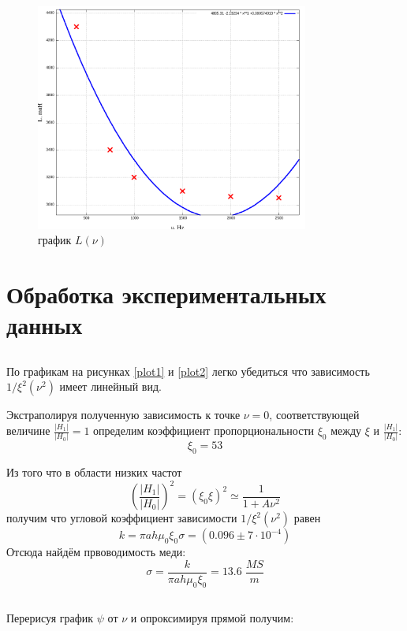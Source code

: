 \documentclass{article}
\begin{document}
\begin{figure}[H]
    \centering
    \includegraphics[width=0.8\textwidth]{6.png}
    \caption{график \( L(\nu) \)}
    \label{fig:L}
\end{figure}

\section {Обработка экспериментальных данных}
\subsection{}
\label{sigma_1}
По графикам на рисунках \ref{plot1} и \ref{plot2} легко убедиться что зависимость \( 1/\xi^2(\nu^2) \)
имеет линейный вид.

Экстраполируя полученную зависимость к точке \( \nu = 0 \), соответствующей величине \( \frac{|H_1|}{|H_0|} = 1 \)
определим коэффициент пропорциональности \( \xi_0 \) между \( \xi \) и \( \frac{|H_1|}{|H_0|} \): 
\[ \xi_0 = 53 \]

Из того что в области низких частот
\[ \left(\frac{|H_1|}{|H_0|}\right)^2 = (\xi_0\xi)^2 \simeq \frac{1}{1 + A\nu^2} \]
получим что угловой коэффициент зависимости \( 1/\xi^2(\nu^2) \) равен
\[ k = \pi ah\mu_0\xi_0\sigma = (0.096 \pm 7\cdot10^{-4}) \]
Отсюда найдём првоводимость меди:
\[ \sigma = \frac{k}{\pi ah\mu_0\xi_0} = 13.6\; \frac{MS}{m} \]

\subsection{}\label{sigma_2}
Перерисуя график \( \psi \) от \( \nu \) и опроксимируя прямой получим:
\end{document}
